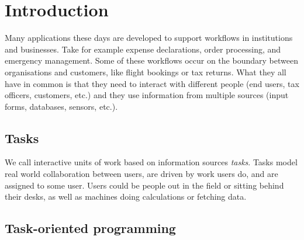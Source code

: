 


\section{Introduction}


Many applications these days are developed to support workflows in institutions and businesses.
Take for example expense declarations, order processing, and emergency management.
Some of these workflows occur on the boundary between organisations and customers,
like flight bookings or tax returns.
What they all have in common is
that they need to interact with different people (end users, tax officers, customers, etc.)
and they use information from multiple sources (input forms, databases, sensors, etc.).

\subsection{Tasks}

We call interactive units of work based on information sources \emph{tasks}.
Tasks model real world collaboration between users,
are driven by work users do,
and are assigned to some user.
Users could be people out in the field or sitting behind their desks,
as well as machines doing calculations or fetching data.



\subsection{Task-oriented programming}
\label{sec:top}


